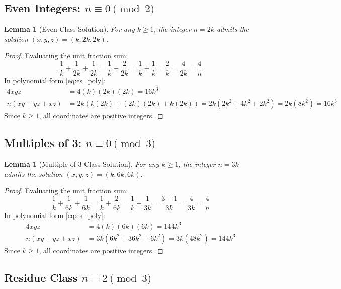 \documentclass[11pt,a4paper]{article}
\newtheorem{lemma}[theorem]{Lemma}
\theoremstyle{definition}
\begin{document}
\subsection{Even Integers: \texorpdfstring{$n \equiv 0 \pmod 2$}{n = 0 mod 2}}

\begin{lemma}[Even Class Solution]\label{lem:mod2}
For any $k \ge 1$, the integer $n = 2k$ admits the solution $(x, y, z) = (k, 2k, 2k)$.
\end{lemma}

\begin{proof}
Evaluating the unit fraction sum:
\[ \frac{1}{k} + \frac{1}{2k} + \frac{1}{2k} = \frac{1}{k} + \frac{2}{2k} = \frac{1}{k} + \frac{1}{k} = \frac{2}{k} = \frac{4}{2k} = \frac{4}{n} \]
In polynomial form \eqref{eq:es_poly}:
\begin{align*}
4 x y z &= 4 (k)(2k)(2k) = 16 k^3 \\
n (x y + y z + x z) &= 2k \left( k(2k) + (2k)(2k) + k(2k) \right) = 2k (2k^2 + 4k^2 + 2k^2) = 2k (8k^2) = 16 k^3
\end{align*}
Since $k \ge 1$, all coordinates are positive integers.
\end{proof}

\subsection{Multiples of 3: \texorpdfstring{$n \equiv 0 \pmod 3$}{n = 0 mod 3}}

\begin{lemma}[Multiple of 3 Class Solution]\label{lem:mod3_0}
For any $k \ge 1$, the integer $n = 3k$ admits the solution $(x, y, z) = (k, 6k, 6k)$.
\end{lemma}

\begin{proof}
Evaluating the unit fraction sum:
\[ \frac{1}{k} + \frac{1}{6k} + \frac{1}{6k} = \frac{1}{k} + \frac{2}{6k} = \frac{1}{k} + \frac{1}{3k} = \frac{3 + 1}{3k} = \frac{4}{3k} = \frac{4}{n} \]
In polynomial form \eqref{eq:es_poly}:
\begin{align*}
4 x y z &= 4 (k)(6k)(6k) = 144 k^3 \\
n (x y + y z + x z) &= 3k \left( 6k^2 + 36k^2 + 6k^2 \right) = 3k (48k^2) = 144 k^3
\end{align*}
Since $k \ge 1$, all coordinates are positive integers.
\end{proof}

\subsection{Residue Class \texorpdfstring{$n \equiv 2 \pmod 3$}{n = 2 mod 3}}
\end{document}
